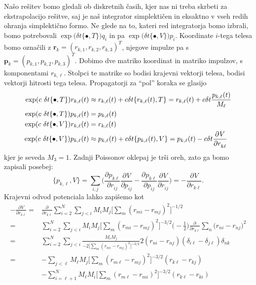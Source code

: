 \documentclass[12pt, a4paper]{article}
\renewcommand{\r}{
    \ensuremath{\mathbf{r}}
}
\newcommand{\p}{
    \ensuremath{\mathbf{p}}
}
\newcommand{\sfrac}[2]{
    \ensuremath{\textstyle{\frac{#1}{#2}}}
}
\newcommand{\der}[3][]{
    \ensuremath{ \frac{\partial^{#1} #2}{\partial #3^{#1}} }
}
\begin{document}
Na\v so re\v sitev bomo gledali ob diskretnih \v casih, kjer nas ni treba skrbeti za ekstrapolacijo
re\v sitve, saj je na\v s integrator simplekti\v cen in eksaktno v vseh redih ohranja simplekti\v cno
formo. Ne glede na to, kateri red integratorja bomo izbrali, bomo potrebovali $\exp\big(\delta
t\{\bullet,T\}\big) q_i$ in pa $\exp\big(\delta t\{\bullet,V\}\big) p_i$. Koordinate $i$-tega telesa bomo
ozna\v cili z $\r_k = (r_{k,1}, r_{k,2}, r_{k,3})^T$, njegove impulze pa s $\p_k = (p_{k,1}, p_{k,2}, p_{k,3})^T$.
Dobimo dve matriko koordinat in matriko impulzov, s komponentami $r_{k,\ell}$. Stolpci te matrike so bodisi
krajevni vektorji telesa, bodisi vektorji hitrosti tega telesa. Propagatorji za "`pol"' koraka se glasijo
\begin{align}
    \exp(c\ \delta t\{\bullet, T\}) r_{k,\ell}(t) &\approx r_{k,\ell}(t) + c\delta t\{r_{k,\ell}(t), T\} = r_{k,\ell}(t)
        + c\delta t \frac{p_{k,\ell}(t)}{M_\ell} \notag \\
    \exp(c\ \delta t\{\bullet, T\}) p_{k,\ell}(t) &= p_{k,\ell} (t) \notag \\
    \exp(c\ \delta t\{\bullet, V\}) r_{k,\ell}(t) &= r_{k,\ell} (t) \notag \\
    \exp(c\ \delta t\{\bullet, V\}) p_{k,\ell}(t) &\approx p_{k,\ell} (t) + c\delta t\{p_{k,\ell}(t), V\} = p_{k,\ell}(t)
        -c\delta t \der{V}{r_{k\ell}}
\end{align}
kjer je seveda $M_3 = 1$. Zadnji Poissonov oklepaj je tr\v si oreh, zato ga bomo zapisali posebej:
\begin{equation*}
    \{p_{k,\ell}, V\} = \sum_{i,j}\bigg(\der{p_{k\ell}}{r_{ij}}\der{V}{p_{ij}} - \der{p_{k\ell}}{p_{ij}}
        \der{V}{r_{ij}}\bigg) = - \der{V}{r_{k\ell}}.
\end{equation*}
Krajevni odvod potenciala lahko zapi\v semo kot
\begin{align*}
    -\der{V}{r_{k\ell}} =& \der{}{r_{k\ell}} \sum_{i=2}^N\sum_{j < i} M_i M_j \Big[\sum_m(r_{mi} - r_{mj})^2\Big]^{-1/2} \\
    =& \sum_{i=2}^N\sum_{j<i} M_i M_j \Big[\sum_m (r_{mi} - r_{mj})^2\Big]^{-3/2}
        \big(-\sfrac{1}{2}\big)\displaystyle{\der{}{r_{k\ell}}}\sum_n\big(r_{ni} - r_{nj}\big)^2 \\
    =& \sum_{i = 2}^N\sum_{j<i} \frac{M_i M_j}{-2\big[\sum_m (r_{mi} - r_{mj})^2\big]^{-3/2}}
        2(r_{ni} - r_{nj})(\delta_{i\ell} - \delta_{j\ell})\delta_{nk} \\
    =& -\sum_{j < \ell} M_\ell M_j\Big[\sum_m (r_{m\ell} - r_{mj})^2\Big]^{-3/2}(r_{k\ell} - r_{kj}) \\
    &- \sum_{i = \ell+1}^N M_{\ell} M_i\Big[\sum_m (r_{m\ell} - r_{mi})^2\Big]^{-3/2}(r_{k\ell} - r_{ki}) 
\end{align*}
\end{document}
